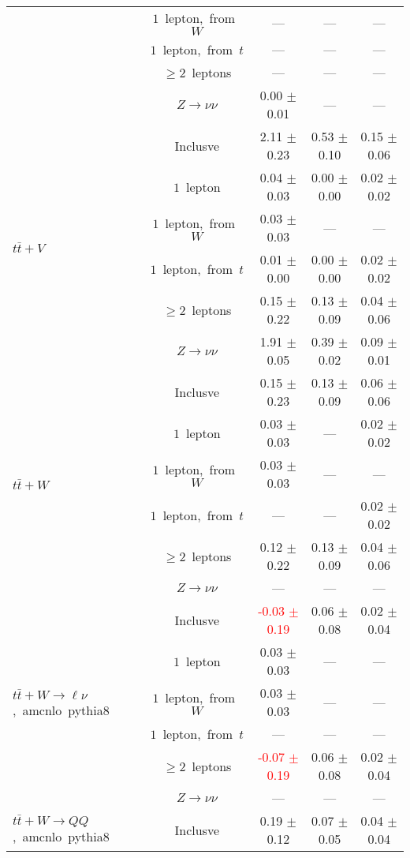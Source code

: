 \documentclass{article}
\begin{document}
\begin{longtable}{|l|c|c|c|c|}
 & $1$~lepton,~from~$W$  & ---  & ---  & --- \\* 
 & $1$~lepton,~from~$t$  & ---  & ---  & --- \\* 
 & $\ge2$~leptons  & ---  & ---  & --- \\* 
 & $Z\rightarrow\nu\nu$  & 0.00 $\pm$ 0.01  & ---  & --- \\* 
\hline 
\multirow{6}{*}{$t\bar{t}+V$} & Inclusve  & 2.11 $\pm$ 0.23  & 0.53 $\pm$ 0.10  & 0.15 $\pm$ 0.06 \\* 
 & $1$~lepton  & 0.04 $\pm$ 0.03  & 0.00 $\pm$ 0.00  & 0.02 $\pm$ 0.02 \\* 
 & $1$~lepton,~from~$W$  & 0.03 $\pm$ 0.03  & ---  & --- \\* 
 & $1$~lepton,~from~$t$  & 0.01 $\pm$ 0.00  & 0.00 $\pm$ 0.00  & 0.02 $\pm$ 0.02 \\* 
 & $\ge2$~leptons  & 0.15 $\pm$ 0.22  & 0.13 $\pm$ 0.09  & 0.04 $\pm$ 0.06 \\* 
 & $Z\rightarrow\nu\nu$  & 1.91 $\pm$ 0.05  & 0.39 $\pm$ 0.02  & 0.09 $\pm$ 0.01 \\* 
\hline 
\multirow{6}{*}{$t\bar{t}+W$} & Inclusve  & 0.15 $\pm$ 0.23  & 0.13 $\pm$ 0.09  & 0.06 $\pm$ 0.06 \\* 
 & $1$~lepton  & 0.03 $\pm$ 0.03  & ---  & 0.02 $\pm$ 0.02 \\* 
 & $1$~lepton,~from~$W$  & 0.03 $\pm$ 0.03  & ---  & --- \\* 
 & $1$~lepton,~from~$t$  & ---  & ---  & 0.02 $\pm$ 0.02 \\* 
 & $\ge2$~leptons  & 0.12 $\pm$ 0.22  & 0.13 $\pm$ 0.09  & 0.04 $\pm$ 0.06 \\* 
 & $Z\rightarrow\nu\nu$  & ---  & ---  & --- \\* 
\hline 
\multirow{6}{*}{$t\bar{t}+W{\rightarrow}{\ell}{\nu}$,~amcnlo~pythia8} & Inclusve  & \textcolor{red}{ -0.03 $\pm$ 0.19 }  & 0.06 $\pm$ 0.08  & 0.02 $\pm$ 0.04 \\* 
 & $1$~lepton  & 0.03 $\pm$ 0.03  & ---  & --- \\* 
 & $1$~lepton,~from~$W$  & 0.03 $\pm$ 0.03  & ---  & --- \\* 
 & $1$~lepton,~from~$t$  & ---  & ---  & --- \\* 
 & $\ge2$~leptons  & \textcolor{red}{ -0.07 $\pm$ 0.19 }  & 0.06 $\pm$ 0.08  & 0.02 $\pm$ 0.04 \\* 
 & $Z\rightarrow\nu\nu$  & ---  & ---  & --- \\* 
\hline 
\multirow{6}{*}{$t\bar{t}+W{\rightarrow}QQ$,~amcnlo~pythia8} & Inclusve  & 0.19 $\pm$ 0.12  & 0.07 $\pm$ 0.05  & 0.04 $\pm$ 0.04 \\* 

\end{longtable}
\end{document}
